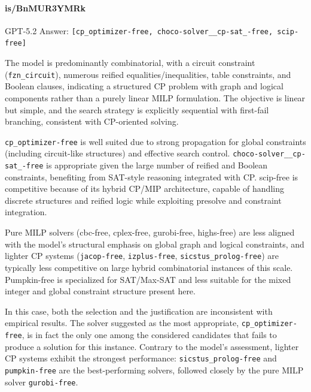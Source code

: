 \documentclass[../../main]{subfiles}
\begin{document}
\paragraph{is/BnMUR3YMRk}
\begin{floatingdefinition}{GPT-5.2 Answer:}
    \texttt{[cp\_optimizer-free, choco-solver\_\_cp-sat\_-free, scip-free]}

    The model is predominantly combinatorial, with a circuit constraint (\texttt{fzn\_circuit}), numerous reified equalities/inequalities, table constraints, and Boolean clauses, indicating a structured CP problem with graph and logical components rather than a purely linear MILP formulation. The objective is linear but simple, and the search strategy is explicitly sequential with first-fail branching, consistent with CP-oriented solving.

    \texttt{cp\_optimizer-free} is well suited due to strong propagation for global constraints (including circuit-like structures) and effective search control. \texttt{choco-solver\_\_cp-sat\_-free} is appropriate given the large number of reified and Boolean constraints, benefiting from SAT-style reasoning integrated with CP. scip-free is competitive because of its hybrid CP/MIP architecture, capable of handling discrete structures and reified logic while exploiting presolve and constraint integration.

    Pure MILP solvers (cbc-free, cplex-free, gurobi-free, highs-free) are less aligned with the model's structural emphasis on global graph and logical constraints, and lighter CP systems (\texttt{jacop-free}, \texttt{izplus-free}, \texttt{sicstus\_prolog-free}) are typically less competitive on large hybrid combinatorial instances of this scale. Pumpkin-free is specialized for SAT/Max-SAT and less suitable for the mixed integer and global constraint structure present here.
\end{floatingdefinition}

In this case, both the selection and the justification are inconsistent with empirical results. The solver suggested as the most appropriate, \texttt{cp\_optimizer-free}, is in fact the only one among the considered candidates that fails to produce a solution for this instance. Contrary to the model's assessment, lighter CP systems exhibit the strongest performance: \texttt{sicstus\_prolog-free} and \texttt{pumpkin-free} are the best-performing solvers, followed closely by the pure MILP solver \texttt{gurobi-free}.
\end{document}

